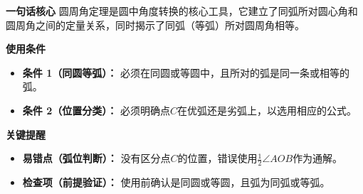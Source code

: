\begin{summarybox}
	\textbf{\textcolor{CSummary}{一句话核心}}
	圆周角定理是圆中角度转换的核心工具，它建立了同弧所对圆心角和圆周角之间的定量关系，同时揭示了同弧（等弧）所对圆周角相等。

	\medskip
	\textbf{\textcolor{CSummary}{使用条件}}
	\begin{itemize}[leftmargin=*, itemsep=0.5em, topsep=0.4em]
		\item \textbf{条件 1（同圆等弧）：} 必须在同圆或等圆中，且所对的弧是同一条或相等的弧。
		\item \textbf{条件 2（位置分类）：} 必须明确点$C$在优弧还是劣弧上，以选用相应的公式。
	\end{itemize}

	\medskip
	\textbf{\textcolor{CSummary}{关键提醒}}
	\begin{itemize}[leftmargin=*, itemsep=0.5em, topsep=0.4em]
		\item \textbf{易错点（弧位判断）：} 没有区分点$C$的位置，错误使用$\frac12\angle AOB$作为通解。
		\item \textbf{检查项（前提验证）：} 使用前确认是同圆或等圆，且弧为同弧或等弧。
	\end{itemize}

\end{summarybox}
